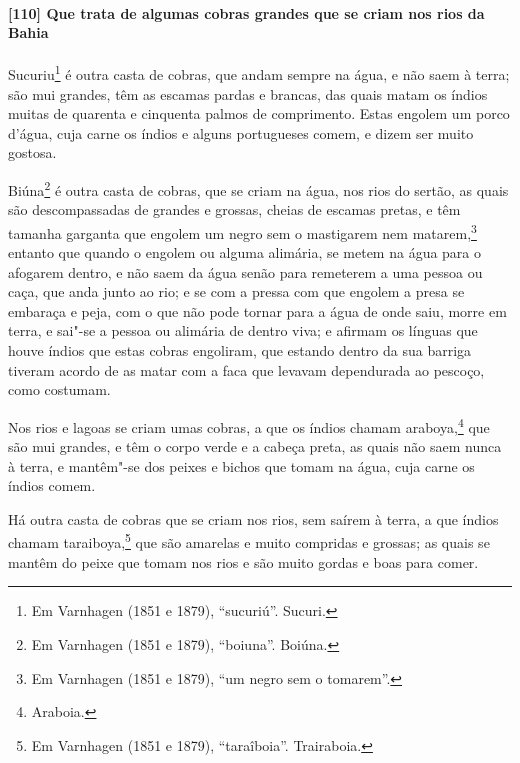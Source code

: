 \paragraph{[110] Que trata de algumas cobras grandes que se criam nos rios da Bahia}\quad
Sucuriu\footnote{ Em Varnhagen (1851 e 1879), ``sucuriú''. Sucuri.} é outra casta de
cobras, que andam sempre na água, e não saem à terra; são mui grandes, têm as escamas
pardas e brancas, das quais matam os índios muitas de quarenta e cinquenta palmos de
comprimento. Estas engolem um porco d'água, cuja carne os índios e alguns portugueses
comem, e dizem ser muito gostosa.

Biúna\footnote{ Em Varnhagen (1851 e 1879), ``boiuna''. Boiúna.} é outra casta de cobras,
que se criam na água, nos rios do sertão, as quais são descompassadas de grandes e
grossas, cheias de escamas pretas, e têm tamanha garganta que engolem um negro sem o
mastigarem nem matarem,\footnote{ Em Varnhagen (1851 e 1879), ``um negro sem o
tomarem''.} entanto que quando o engolem ou alguma alimária, se metem na água para o
afogarem dentro, e não saem da água senão para remeterem a uma pessoa ou caça, que anda
junto ao rio; e se com a pressa com que engolem a presa se embaraça e peja, com o que não
pode tornar para a água de onde saiu, morre em terra, e sai"-se a pessoa ou alimária de
dentro viva; e afirmam os línguas que houve índios que estas cobras engoliram, que estando
dentro da sua barriga tiveram acordo de as matar com a faca que levavam dependurada ao
pescoço, como costumam.

Nos rios e lagoas se criam umas cobras, a que os índios chamam araboya,\footnote{
Araboia.} que são mui grandes, e têm o corpo verde e a cabeça preta, as quais não saem
nunca à terra, e mantêm"-se dos peixes e bichos que tomam na água, cuja carne os índios
comem.

Há outra casta de cobras que se criam nos rios, sem saírem à terra, a que índios chamam
taraiboya,\footnote{ Em Varnhagen (1851 e 1879), ``taraîboia''. Trairaboia.} que são
amarelas e muito compridas e grossas; as quais se mantêm do peixe que tomam nos rios e são
muito gordas e boas para comer.


